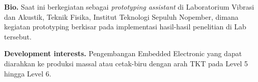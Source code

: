 %
%

\par{
{\textbf{Bio.}}
Saat ini berkegiatan sebagai \textit{prototyping assistant} di Laboratorium Vibrasi dan Akustik, Teknik Fisika, Institut Teknologi Sepuluh Nopember,
 dimana kegiatan prototyping berkisar pada implementasi hasil-hasil penelitian di Lab tersebut.

{\textbf{Development interests.}}
Pengembangan Embedded Electronic yang dapat diarahkan ke produksi massal atau cetak-biru dengan arah TKT pada Level 5 hingga Level 6.
}